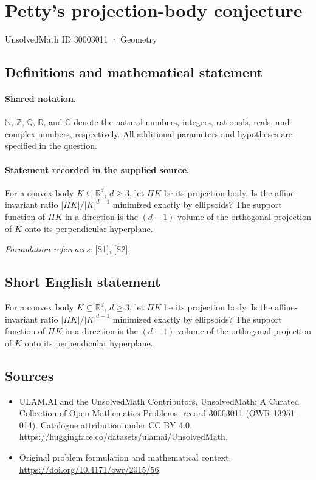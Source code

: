 \documentclass[11pt]{article}
\newcommand{\sref}[2]{\hyperlink{source:#1:#2}{[S#2]}}
\begin{document}
\setcounter{section}{30003010}
\section{Petty's projection-body conjecture}\label{30003011}
{\small UnsolvedMath ID 30003011 · Geometry}
\subsection{Definitions and mathematical statement}

\paragraph{Shared notation.}$\mathbb N$, $\mathbb Z$, $\mathbb Q$, $\mathbb R$, and $\mathbb C$ denote the natural numbers, integers, rationals, reals, and complex numbers, respectively. All additional parameters and hypotheses are specified in the question.


\paragraph{Statement recorded in the supplied source.}
For a convex body $K\subseteq\mathbb R^d$, $d\geq3$, let $\Pi K$ be its projection body. Is the affine-invariant ratio $|\Pi K|/|K|^{d-1}$ minimized exactly by ellipsoids? The support function of $\Pi K$ in a direction is the $(d-1)$-volume of the orthogonal projection of $K$ onto its perpendicular hyperplane.
\par\smallskip\textit{Formulation references:} \sref{30003011}{1}, \sref{30003011}{2}.
\subsection{Short English statement}
For a convex body $K\subseteq\mathbb R^d$, $d\geq3$, let $\Pi K$ be its projection body. Is the affine-invariant ratio $|\Pi K|/|K|^{d-1}$ minimized exactly by ellipsoids? The support function of $\Pi K$ in a direction is the $(d-1)$-volume of the orthogonal projection of $K$ onto its perpendicular hyperplane.
\subsection{Sources}
\begin{itemize}
\item[\hypertarget{source:30003011:1}{S1}] ULAM.AI and the UnsolvedMath Contributors, UnsolvedMath: A Curated Collection of Open Mathematics Problems, record 30003011 (OWR-13951-014). Catalogue attribution under CC BY 4.0.
\url{https://huggingface.co/datasets/ulamai/UnsolvedMath}.
\item[\hypertarget{source:30003011:2}{S2}] Original problem formulation and mathematical context.
\url{https://doi.org/10.4171/owr/2015/56}.
\end{itemize}
\label{end:30003011}
\end{document}
